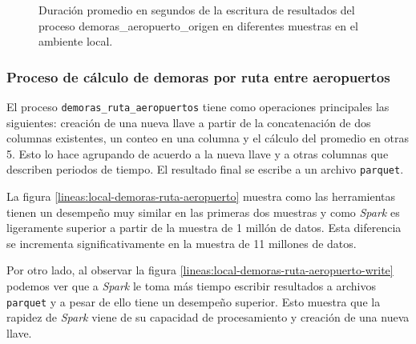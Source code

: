 \begin{figure}
\centering
{}
\caption{Duración promedio en segundos de la escritura de resultados del proceso demoras\_aeropuerto\_origen en diferentes muestras en el ambiente local.}
\label{lineas:local-demoras-aeropuerto-origen-write}
\end{figure}

\subsubsection{Proceso de cálculo de demoras por ruta entre aeropuertos}

El proceso \texttt{demoras\_ruta\_aeropuertos} tiene como operaciones principales las siguientes: creación de una nueva llave a partir de la concatenación de dos columnas existentes, un conteo en una columna y el cálculo del promedio en otras 5. Esto lo hace agrupando de acuerdo a la nueva llave y a otras columnas que describen periodos de tiempo. El resultado final se escribe a un archivo \texttt{parquet}.

La figura \ref{lineas:local-demoras-ruta-aeropuerto} muestra como las herramientas tienen un desempeño muy similar en las primeras dos muestras y como \textit{Spark} es ligeramente superior a partir de la muestra de 1 millón de datos. Esta diferencia se incrementa significativamente en la muestra de 11 millones de datos. 

Por otro lado, al observar la figura \ref{lineas:local-demoras-ruta-aeropuerto-write} podemos ver que a \textit{Spark} le toma más tiempo escribir resultados a archivos \texttt{parquet} y a pesar de ello tiene un desempeño superior. Esto muestra que la rapidez de \textit{Spark} viene de su capacidad de procesamiento y creación de una nueva llave.

